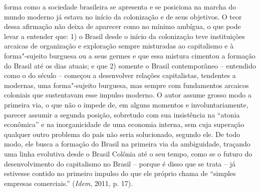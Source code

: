 forma como a sociedade brasileira se apresenta e se posiciona na marcha
do mundo moderno já estava no início da colonização e de seus objetivos.
O teor dessa afirmação não deixa de aparecer como no mínimo ambígua, o
que pode levar a entender que: 1) o Brasil desde o início da colonização
teve instituições arcaicas de organização e exploração sempre misturadas
ao capitalismo e à forma"-sujeito burguesa ou a seus germes e que essa
mistura cimentou a formação do Brasil até os dias atuais; e que 2)
somente o Brasil contemporâneo -- entendido como o do século  --
começou a desenvolver relações capitalistas, tendentes a modernas, uma
forma"-sujeito burguesa, mas sempre com fundamentos arcaicos coloniais
que sustentavam esse impulso moderno. O autor assume grosso modo a
primeira via, o que não o impede de, em alguns momentos e
involuntariamente, parecer assumir a segunda posição, sobretudo com sua
insistência na ``atonia econômica'' e na inorganicidade de uma economia
interna, sem cuja superação qualquer outro problema do país não seria
solucionado, segundo ele. De todo modo, ele busca a formação do Brasil
na primeira via da ambiguidade, traçando uma linha evolutiva desde o
Brasil Colônia até o seu tempo, como se o futuro do desenvolvimento do
capitalismo no Brasil -- porque é disso que se trata -- já estivesse
contido no primeiro impulso do que ele próprio chama de ``simples
empresas comerciais.'' (\emph{Idem}, 2011, p. 17).

